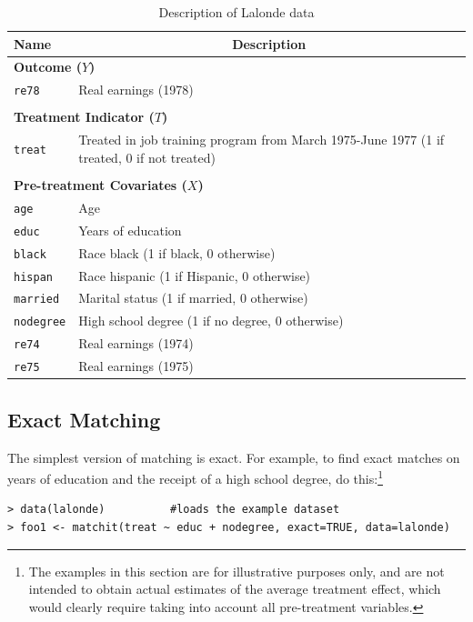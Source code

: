 \documentclass[oneside,letterpaper,titlepage]{article}
\begin{document}
\begin{table}[h]
\label{dwvars}
\centering
\begin{tabular}{lp{3in}}
  \hline 
  \multicolumn{1}{l}{Name} & \multicolumn{1}{c}{Description} \\
  \hline
  \multicolumn{2}{l}{\textbf{Outcome ($Y$)}} \\ 
  \texttt{re78} & Real earnings (1978) \\\\
  \multicolumn{2}{l}{\textbf{Treatment Indicator ($T$)}} \\
  \texttt{treat} & Treated in job training program from March 1975-June
  1977 (1 if treated, 0 if not treated)
  \\ \\
  \multicolumn{2}{l}{\textbf{Pre-treatment Covariates ($X$)}} \\
  \texttt{age} & Age\\
  \texttt{educ} & Years of education \\
  \texttt{black} & Race black (1 if black, 0 otherwise) \\
  \texttt{hispan} & Race hispanic  (1 if Hispanic, 0 otherwise) \\
  \texttt{married} & Marital status (1 if married, 0 otherwise) \\
  \texttt{nodegree} & High school degree (1 if no degree, 0 otherwise)\\
  \texttt{re74} & Real earnings (1974) \\
  \texttt{re75} & Real earnings (1975) \\ 
  \hline
\end{tabular}\label{lalonde}
\caption{Description of Lalonde data}
\end{table}

\subsection{Exact Matching \label{exactm}}
The simplest version of matching is exact.  For example, to find exact
matches on years of education and the receipt of a high school degree,
do this:\footnote{The examples in this section are for illustrative
  purposes only, and are not intended to obtain actual estimates of
  the average treatment effect, which would clearly require taking
  into account all pre-treatment variables.}

\begin{verbatim}
> data(lalonde)          #loads the example dataset
> foo1 <- matchit(treat ~ educ + nodegree, exact=TRUE, data=lalonde)
\end{verbatim}
\end{document}
